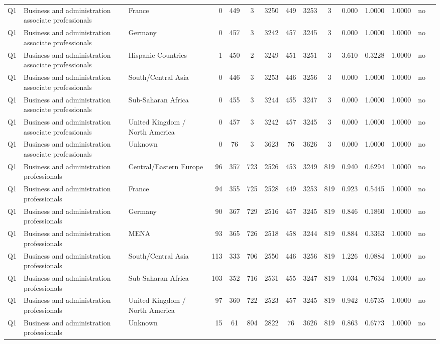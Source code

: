 \begin{longtable}{lllrcccccccccll}
Q1 & Business and administration associate professionals & France & 0 & 449 & 3 & 3250 & 449 & 3253 & 3 & 0.000 & 1.0000 & 1.0000 & no \\
Q1 & Business and administration associate professionals & Germany & 0 & 457 & 3 & 3242 & 457 & 3245 & 3 & 0.000 & 1.0000 & 1.0000 & no \\
Q1 & Business and administration associate professionals & Hispanic Countries & 1 & 450 & 2 & 3249 & 451 & 3251 & 3 & 3.610 & 0.3228 & 1.0000 & no \\
Q1 & Business and administration associate professionals & South/Central Asia & 0 & 446 & 3 & 3253 & 446 & 3256 & 3 & 0.000 & 1.0000 & 1.0000 & no \\
Q1 & Business and administration associate professionals & Sub-Saharan Africa & 0 & 455 & 3 & 3244 & 455 & 3247 & 3 & 0.000 & 1.0000 & 1.0000 & no \\
Q1 & Business and administration associate professionals & United Kingdom / North America & 0 & 457 & 3 & 3242 & 457 & 3245 & 3 & 0.000 & 1.0000 & 1.0000 & no \\
Q1 & Business and administration associate professionals & Unknown & 0 & 76 & 3 & 3623 & 76 & 3626 & 3 & 0.000 & 1.0000 & 1.0000 & no \\
Q1 & Business and administration professionals & Central/Eastern Europe & 96 & 357 & 723 & 2526 & 453 & 3249 & 819 & 0.940 & 0.6294 & 1.0000 & no \\
Q1 & Business and administration professionals & France & 94 & 355 & 725 & 2528 & 449 & 3253 & 819 & 0.923 & 0.5445 & 1.0000 & no \\
Q1 & Business and administration professionals & Germany & 90 & 367 & 729 & 2516 & 457 & 3245 & 819 & 0.846 & 0.1860 & 1.0000 & no \\
Q1 & Business and administration professionals & MENA & 93 & 365 & 726 & 2518 & 458 & 3244 & 819 & 0.884 & 0.3363 & 1.0000 & no \\
Q1 & Business and administration professionals & South/Central Asia & 113 & 333 & 706 & 2550 & 446 & 3256 & 819 & 1.226 & 0.0884 & 1.0000 & no \\
Q1 & Business and administration professionals & Sub-Saharan Africa & 103 & 352 & 716 & 2531 & 455 & 3247 & 819 & 1.034 & 0.7634 & 1.0000 & no \\
Q1 & Business and administration professionals & United Kingdom / North America & 97 & 360 & 722 & 2523 & 457 & 3245 & 819 & 0.942 & 0.6735 & 1.0000 & no \\
Q1 & Business and administration professionals & Unknown & 15 & 61 & 804 & 2822 & 76 & 3626 & 819 & 0.863 & 0.6773 & 1.0000 & no \\

\end{longtable}
